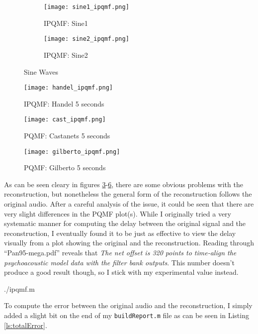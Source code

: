 \documentclass{article} %
\begin{document}
\begin{figure}[H]

\begin{subfigure}{0.5\textwidth}
\centering
\texttt{[image: sine1\_ipqmf.png]}
\caption{IPQMF: Sine1}
\label{fig:sin1IQMF}
\end{subfigure}
\begin{subfigure}{0.5\textwidth}
\centering
\texttt{[image: sine2\_ipqmf.png]}
\caption{IPQMF: Sine2}
\label{fig:sin2IQMF}
\end{subfigure}
\caption{Sine Waves}
\label{fig:sinIPQMF}
\end{figure}
 

\begin{figure}[H]
\centering
\texttt{[image: handel\_ipqmf.png]}
\caption{IPQMF: Handel 5 seconds}
\label{fig:handIQMF}
\end{figure}

\begin{figure}[H]
\centering
\texttt{[image: cast\_ipqmf.png]}
\caption{PQMF: Castanets 5 seconds}
\label{fig:castIQMF}
\end{figure}


\begin{figure}[H]
\centering
\texttt{[image: gilberto\_ipqmf.png]}
\caption{PQMF: Gilberto 5 seconds}
\label{fig:gilbIQMF}
\end{figure}


As can be seen cleary in figures \ref{fig:sinIPQMF}-\ref{fig:gilbIQMF}, there are some obvious problems with the reconstruction, but
nonetheless the general form of the reconstruction follows the original audio. After a careful analysis of the issue, it could be seen that
there are very slight differences in the PQMF plot(s). While I originally tried a very systematic manner for computing the delay
between the original signal and the reconstruction, I eventually found it to be just as effective to view the delay visually from
a plot showing the original and the reconstruction. Reading through ``Pan95-mega.pdf'' reveals that 
\emph{The net offset is 320 points to time-align the psychoacoustic model data with the filter bank outputs}. This number
doesn't produce a good result though, so I stick with my experimental value instead. 



{./ipqmf.m} 


To compute the error between the original audio and the reconstruction, I simply added a slight bit on the end of my \verb|buildReport.m| file
as can be seen in Listing \ref{ls:totalError}.
\end{document}
